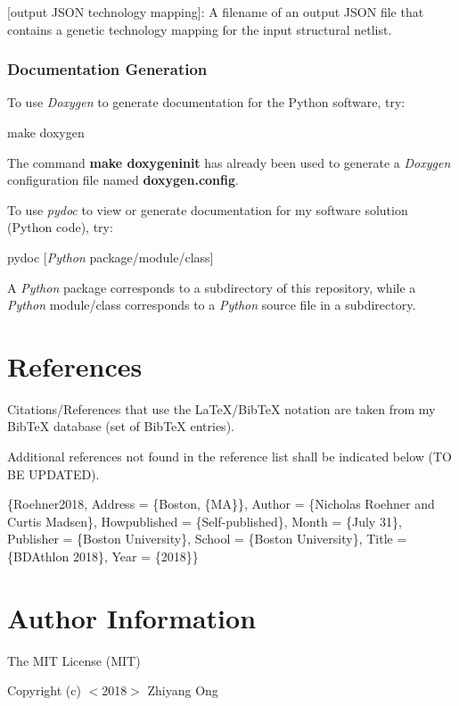 \mbox{[}output J\+S\+O\+N technology mapping\mbox{]}\+: A filename of an output J\+S\+O\+N file that contains a genetic technology mapping for the input structural netlist.

\subsubsection*{Documentation Generation}

To use {\itshape Doxygen} to generate documentation for the Python software, try\+: \begin{DoxyVerb}make doxygen
\end{DoxyVerb}


The command {\bfseries make doxygeninit} has already been used to generate a {\itshape Doxygen} configuration file named {\bfseries doxygen.\+config}.

To use {\itshape pydoc} to view or generate documentation for my software solution (Python code), try\+:

pydoc \mbox{[}{\itshape Python} package/module/class\mbox{]}

A {\itshape Python} package corresponds to a subdirectory of this repository, while a {\itshape Python} module/class corresponds to a {\itshape Python} source file in a subdirectory.

\section*{References}

Citations/\+References that use the La\+Te\+X/\+Bib\+Te\+X notation are taken from my Bib\+Te\+X database (set of Bib\+Te\+X entries).

Additional references not found in the reference list shall be indicated below (T\+O B\+E U\+P\+D\+A\+T\+E\+D).

\{Roehner2018, Address = \{Boston, \{M\+A\}\}, Author = \{Nicholas Roehner and Curtis Madsen\}, Howpublished = \{Self-\/published\}, Month = \{July 31\}, Publisher = \{Boston University\}, School = \{Boston University\}, Title = \{B\+D\+Athlon 2018\}, Year = \{2018\}\}

\section*{Author Information}

The M\+I\+T License (M\+I\+T)

Copyright (c) $<$2018$>$ Zhiyang Ong

